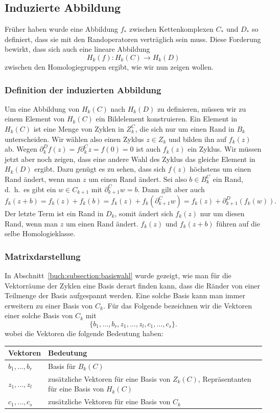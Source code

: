 \subsection{Induzierte Abbildung
\label{buch:subsection:induzierte-abbildung}}
Früher haben wurde eine Abbildung $f_*$ zwischen Kettenkomplexen $C_*$ und
$D_*$ so definiert,
dass sie mit den Randoperatoren verträglich sein muss.
Diese Forderung bewirkt, dass sich auch eine lineare Abbildung
\[
H_k(f) \colon H_k(C) \to H_k(D)
\]
zwischen den Homologiegruppen ergibt, wie wir nun zeigen wollen.

\subsubsection{Definition der induzierten Abbildung}
Um eine Abbildung von $H_k(C)$ nach $H_k(D)$ zu definieren, müssen wir
zu einem Element von $H_k(C)$ ein Bildelement konstruieren.
Ein Element in $H_k(C)$ ist eine Menge von Zyklen in $Z^C_k$, die sich
nur um einen Rand in $B_k$ unterscheiden.
Wir wählen also einen Zyklus $z\in Z_k$ und bilden ihn auf $f_k(z)$ ab.
Wegen $\partial^D_kf(z)=f\partial^C_kz = f(0) =0 $ ist auch $f_k(z)$
ein Zyklus.
Wir müssen jetzt aber noch zeigen, dass eine andere Wahl des Zyklus
das gleiche Element in $H_k(D)$ ergibt.
Dazu genügt es zu sehen, dass sich $f(z)$ höchstens um einen Rand
ändert, wenn man $z$ um einen Rand ändert.
Sei also $b\in B^C_k$ ein Rand, d.~h.~es gibt ein $w\in C_{k+1}$ mit
$\partial^C_{k+1}w=b$.
Dann gilt aber auch
\[
f_k(z+b)
=
f_k(z) + f_k(b)
=
f_k(z) + f_k(\partial^C_{k+1}w)
=
f_k(z) + \partial^D_{k+1}(f_k(w)).
\]
Der letzte Term ist ein Rand in $D_k$, somit ändert sich $f_k(z)$ nur
um diesen Rand, wenn man $z$ um einen Rand ändert.
$f_k(z)$ und $f_k(z+b)$ führen auf die selbe Homologieklasse.

\subsubsection{Matrixdarstellung}
In Abschnitt~\ref{buch:subsection:basiswahl} wurde gezeigt, wie man
für die Vektorräume der Zyklen eine Basis derart finden kann, 
dass die Ränder von einer Teilmenge der Basis aufgespannt werden.
Eine solche Basis kann man immer erweitern zu einer Basis von $C_k$.
Für das Folgende bezeichnen wir die Vektoren einer solche Basis von $C_k$ 
mit
\[
\{
b_1,\dots, b_r,
z_1,\dots,z_l,
c_1,\dots,c_s
\}.
\]
wobei die Vektoren  die folgende Bedeutung haben:
\begin{center}
\begin{tabular}{|l|p{9cm}|}
\hline
Vektoren&Bedeutung\\
\hline
$b_1,\dots,b_r$ & Basis für $B_k(C)$ \\
$z_1,\dots,z_l$ &{\raggedright zusätzliche Vektoren für eine Basis von $Z_k(C)$, Repräsentanten für eine Basis von $H_k(C)$}\\
$c_1,\dots,c_s$ & zusätzliche Vektoren für eine Basis von $C_k$ \\
\hline
\end{tabular}
\end{center}

